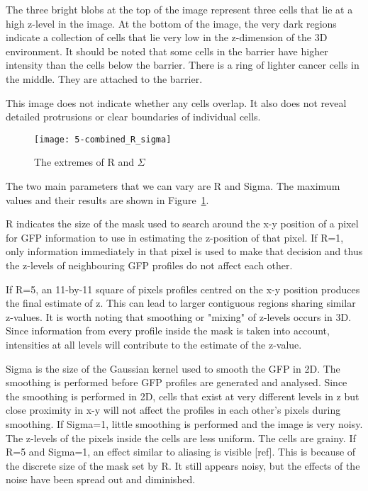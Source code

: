 The three bright blobs at the top of the image represent three cells that lie at a high z-level in the image. At the bottom of the image, the very dark regions indicate a collection of cells that lie very low in the z-dimension of the 3D environment. It should be noted that some cells in the barrier have higher intensity than the cells below the barrier. There is a ring of lighter cancer cells in the middle. They are attached to the barrier.

This image does not indicate whether any cells overlap. It also does not reveal detailed protrusions or clear boundaries of individual cells.

\begin{figure}[htbp!]
\centering
\texttt{[image: 5-combined\_R\_sigma]}
\caption{The extremes of R and $\Sigma$}
\label{fig:r_and_sigma}
\end{figure}

The two main parameters that we can vary are R and Sigma. The maximum values and their results are shown in Figure~\ref{fig:r_and_sigma}.

R indicates the size of the mask used to search around the x-y position of a pixel for GFP information to use in estimating the z-position of that pixel. If R=1, only information immediately in that pixel is used to make that decision and thus the z-levels of neighbouring GFP profiles do not affect each other.

If R=5, an 11-by-11 square of pixels profiles centred on the x-y position produces the final estimate of z. This can lead to larger contiguous regions sharing similar z-values. It is worth noting that smoothing or "mixing" of z-levels occurs in 3D. Since information from every profile inside the mask is taken into account, intensities at all levels will contribute to the estimate of the z-value.

Sigma is the size of the Gaussian kernel used to smooth the GFP in 2D. The smoothing is performed before GFP profiles are generated and analysed. Since the smoothing is performed in 2D, cells that exist at very different levels in z but close proximity in x-y will not affect the profiles in each other's pixels during smoothing. If Sigma=1, little smoothing is performed and the image is very noisy. The z-levels of the pixels inside the cells are less uniform. The cells are grainy. If R=5 and Sigma=1, an effect similar to aliasing is visible [ref]. This is because of the discrete size of the mask set by R. It still appears noisy, but the effects of the noise have been spread out and diminished.

